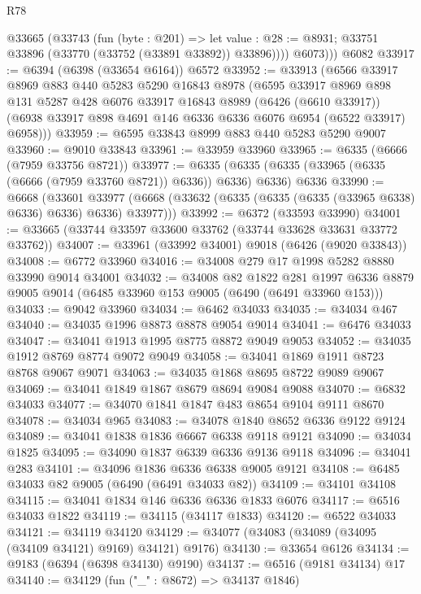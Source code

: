 \begin{lexlean}{R78}
\begin{coremodule}
        @33665
          (@33743
            (fun (byte : @201) =>
            let value : @28 := @8931; @33751 @33896 (@33770 (@33752 (@33891 @33892)) @33896))))
          @6073)))
    @6082
@33917 := @6394 (@6398 (@33654 @6164)) @6572
@33952 := @33913
    (@6566
      @33917
      @8969
      @883
      @440
      @5283
      @5290
      @16843
      @8978
      (@6595
        @33917
        @8969
        @898
        @131
        @5287
        @428
        @6076
        @33917
        @16843
        @8989
        (@6426 (@6610 @33917))
        (@6938 @33917 @898 @4691 @146 @6336 @6336 @6076 @6954 (@6522 @33917) @6958)))
@33959 := @6595 @33843 @8999 @883 @440 @5283 @5290 @9007
@33960 := @9010 @33843
@33961 := @33959 @33960
@33965 := @6335 (@6666 (@7959 @33756 @8721))
@33977 := @6335
    (@6335 (@6335 (@33965 (@6335 (@6666 (@7959 @33760 @8721)) @6336)) @6336) @6336)
    @6336
@33990 := @6668
    (@33601 @33977 (@6668 (@33632 (@6335 (@6335 (@6335 (@33965 @6338) @6336) @6336) @6336) @33977)))
@33992 := @6372 (@33593 @33990)
@34001 := @33665 (@33744 @33597 @33600 @33762 (@33744 @33628 @33631 @33772 @33762))
@34007 := @33961 (@33992 @34001) @9018 (@6426 (@9020 @33843))
@34008 := @6772 @33960
@34016 := @34008 @279 @17 @1998 @5282 @8880 @33990 @9014 @34001
@34032 := @34008
    @82
    @1822
    @281
    @1997
    @6336
    @8879
    @9005
    @9014
    (@6485 @33960 @153 @9005 (@6490 (@6491 @33960 @153)))
@34033 := @9042 @33960
@34034 := @6462 @34033
@34035 := @34034 @467
@34040 := @34035 @1996 @8873 @8878 @9054 @9014
@34041 := @6476 @34033
@34047 := @34041 @1913 @1995 @8775 @8872 @9049 @9053
@34052 := @34035 @1912 @8769 @8774 @9072 @9049
@34058 := @34041 @1869 @1911 @8723 @8768 @9067 @9071
@34063 := @34035 @1868 @8695 @8722 @9089 @9067
@34069 := @34041 @1849 @1867 @8679 @8694 @9084 @9088
@34070 := @6832 @34033
@34077 := @34070 @1841 @1847 @483 @8654 @9104 @9111 @8670
@34078 := @34034 @965
@34083 := @34078 @1840 @8652 @6336 @9122 @9124
@34089 := @34041 @1838 @1836 @6667 @6338 @9118 @9121
@34090 := @34034 @1825
@34095 := @34090 @1837 @6339 @6336 @9136 @9118
@34096 := @34041 @283
@34101 := @34096 @1836 @6336 @6338 @9005 @9121
@34108 := @6485 @34033 @82 @9005 (@6490 (@6491 @34033 @82))
@34109 := @34101 @34108
@34115 := @34041 @1834 @146 @6336 @6336 @1833 @6076
@34117 := @6516 @34033 @1822
@34119 := @34115 (@34117 @1833)
@34120 := @6522 @34033
@34121 := @34119 @34120
@34129 := @34077 (@34083 (@34089 (@34095 (@34109 @34121) @9169) @34121) @9176)
@34130 := @33654 @6126
@34134 := @9183 (@6394 (@6398 @34130) @9190)
@34137 := @6516 (@9181 @34134) @17
@34140 := @34129 (fun ("_" : @8672) => @34137 @1846)

\end{coremodule}
\end{lexlean}
